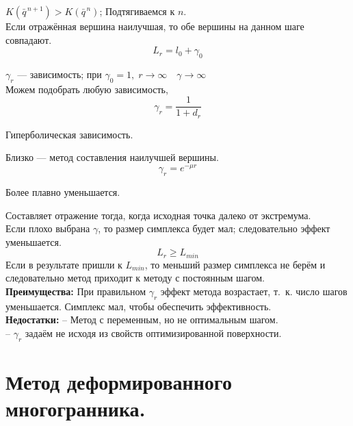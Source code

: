 \documentclass[12pt,a5paper]{scrbook}
\begin{document}
  $K(\bar{q}^{\,n+1}) > K(\bar{q}^{\,n})$; Подтягиваемся к $n$.\\
  
  Если отражённая вершина наилучшая, то обе вершины на данном шаге совпадают. 
  $$L_r = l_0 + \gamma_0$$
  
  $\gamma_r$ --- зависимость; при $\gamma_0 = 1,\;r\rightarrow\infty\quad \gamma\rightarrow\infty$\\
  Можем подобрать любую зависимость,\\
  $$\gamma_r = \frac{1}{1+d_r}$$ 
  \begin{center}Гиперболическая зависимость.\end{center}
  Близко --- метод составления наилучшей вершины.
  $$\gamma_r = e^{-\mu r}$$ 
  \begin{center}Более плавно уменьшается.\end{center}
  Составляет отражение тогда, когда исходная точка далеко от экстремума.\\
  
  Если плохо выбрана $\gamma$, то размер симплекса будет мал; следовательно эффект уменьшается.
  $$L_r \geq L_{min}$$
  Если в результате пришли к $L_{min}$, то меньший размер симплекса не берём и следовательно метод приходит к методу с постоянным шагом.\\
  
  \textbf{Преимущества:}\newline
  При правильном $\gamma_r$ эффект метода возрастает, т.~к. число шагов уменьшается. Симплекс мал, чтобы обеспечить эффективность.\\
  
  \textbf{Недостатки:}\newline
  -- Метод с переменным, но не оптимальным шагом.\\
  -- $\gamma_r$ задаём не исходя из свойств оптимизированной поверхности.
  
  \section{Метод деформированного многогранника.} %
  
  
\end{document}
